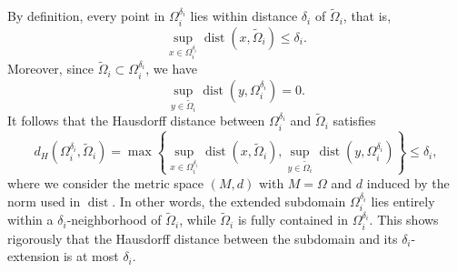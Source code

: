 \noindent By definition, every point in $\Omega_i^{\delta_i}$ lies within distance $\delta_i$ of $\widetilde{\Omega}_i$, that is, 
\begin{equation*}
    \sup_{x \in \Omega_i^{\delta_{i}}} \operatorname{dist}(x, \widetilde{\Omega}_i) \leq \delta_i.
\end{equation*}
Moreover, since $\widetilde{\Omega}_i \subset \Omega_i^{\delta_{i}}$, we have 
\begin{equation*}
    \sup_{y \in \widetilde{\Omega}_i} \operatorname{dist}(y, \Omega_i^{\delta_{i}}) = 0.
\end{equation*}
It follows that the Hausdorff distance between $\Omega_i^{\delta_i}$ and $\widetilde{\Omega}_i$ satisfies
\begin{equation*}
    d_H(\Omega_i^{\delta_{i}}, \widetilde{\Omega}_i) = \max\left\{ \sup_{x \in \Omega_i^{\delta_{i}}} \operatorname{dist}(x, \widetilde{\Omega}_i), \sup_{y \in \widetilde{\Omega}_i} \operatorname{dist}(y, \Omega_i^{\delta_{i}}) \right\} \leq \delta_i,
\end{equation*}
where we consider the metric space $(M,d)$ with $M = \Omega$ and $d$ induced by the norm used in $\operatorname{dist}$. In other words, the extended subdomain $\Omega_i^{\delta_{i}}$ lies entirely within a $\delta_i$-neighborhood of $\widetilde{\Omega}_i$, while $\widetilde{\Omega}_i$ is fully contained in $\Omega_i^{\delta_{i}}$. This shows rigorously that the Hausdorff distance between the subdomain and its $\delta_i$-extension is at most $\delta_i$.

